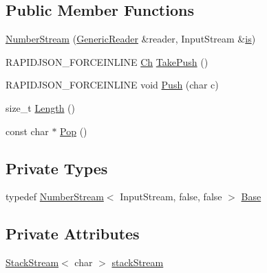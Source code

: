 \subsection*{Public Member Functions}
\begin{DoxyCompactItemize}
\item 
\mbox{\hyperlink{classrapidjson_1_1_generic_reader_1_1_number_stream_3_01_input_stream_00_01true_00_01false_01_4_ac5fb9c88655641fbc9a8532c7acb0220}{Number\+Stream}} (\mbox{\hyperlink{classrapidjson_1_1_generic_reader}{Generic\+Reader}} \&reader, Input\+Stream \&\mbox{\hyperlink{classrapidjson_1_1_generic_reader_1_1_number_stream_3_01_input_stream_00_01false_00_01false_01_4_a89e9acf3bfcc7992f0122383e2c6349e}{is}})
\item 
R\+A\+P\+I\+D\+J\+S\+O\+N\+\_\+\+F\+O\+R\+C\+E\+I\+N\+L\+I\+NE \mbox{\hyperlink{classrapidjson_1_1_generic_reader_1_1_number_stream_3_01_input_stream_00_01false_00_01false_01_4_a2a945ef08d04099027c32f72821a12c0}{Ch}} \mbox{\hyperlink{classrapidjson_1_1_generic_reader_1_1_number_stream_3_01_input_stream_00_01true_00_01false_01_4_ad19c8b2bc2809a106c7e5abcafe0b2f2}{Take\+Push}} ()
\item 
R\+A\+P\+I\+D\+J\+S\+O\+N\+\_\+\+F\+O\+R\+C\+E\+I\+N\+L\+I\+NE void \mbox{\hyperlink{classrapidjson_1_1_generic_reader_1_1_number_stream_3_01_input_stream_00_01true_00_01false_01_4_ace866a289c5b820120776738dc6dc726}{Push}} (char c)
\item 
size\+\_\+t \mbox{\hyperlink{classrapidjson_1_1_generic_reader_1_1_number_stream_3_01_input_stream_00_01true_00_01false_01_4_a14edbf4c96e6cab68a759c70d93763a0}{Length}} ()
\item 
const char $\ast$ \mbox{\hyperlink{classrapidjson_1_1_generic_reader_1_1_number_stream_3_01_input_stream_00_01true_00_01false_01_4_a66209b00a3fd8d0cdd044ceeabc125dc}{Pop}} ()
\end{DoxyCompactItemize}
\subsection*{Private Types}
\begin{DoxyCompactItemize}
\item 
typedef \mbox{\hyperlink{classrapidjson_1_1_generic_reader_1_1_number_stream}{Number\+Stream}}$<$ Input\+Stream, false, false $>$ \mbox{\hyperlink{classrapidjson_1_1_generic_reader_1_1_number_stream_3_01_input_stream_00_01true_00_01false_01_4_a1765e18550d8e335475e6dfe101ac997}{Base}}
\end{DoxyCompactItemize}
\subsection*{Private Attributes}
\begin{DoxyCompactItemize}
\item 
\mbox{\hyperlink{classrapidjson_1_1_generic_reader_1_1_stack_stream}{Stack\+Stream}}$<$ char $>$ \mbox{\hyperlink{classrapidjson_1_1_generic_reader_1_1_number_stream_3_01_input_stream_00_01true_00_01false_01_4_ac88e81009d2f61a9c0ca562246d04931}{stack\+Stream}}
\end{DoxyCompactItemize}
